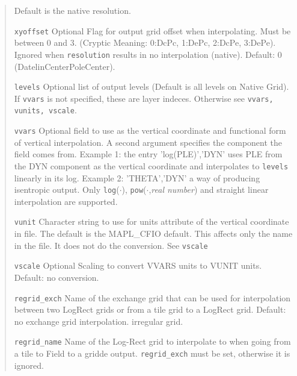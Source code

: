 \begin{quote}
\begin{trivlist}
                          Default is the native resolution.
 \item[\tt xyoffset]      Optional Flag for output grid offset when interpolating. Must be
                          between 0 and 3. (Cryptic Meaning: 0:DcPc, 1:DePc, 2:DcPe, 3:DePe).
                          Ignored when {\tt resolution} results in no interpolation (native).
                          Default: 0 (DatelinCenterPoleCenter). 
 \item[\tt levels]        Optional list of output levels (Default is all levels on Native Grid).
                          If {\tt vvars} is not specified, these are layer indeces. Otherwise
                          see {\tt vvars, vunits, vscale}.
 \item[\tt vvars]         Optional field to use as the vertical coordinate and functional form
                          of vertical interpolation. A second argument specifies 
                          the component the field comes from. 
                          Example 1: the entry 'log(PLE)','DYN' uses PLE from the
                          DYN component as the vertical coordinate and interpolates
                          to {\tt levels} linearly in its log. Example 2: 'THETA','DYN'
                          a way of producing isentropic output.
                          Only {\tt log}($\cdot$), {\tt pow}($\cdot$,{\em real number})
                          and straight linear interpolation are supported.
 \item[\tt vunit]         Character string to use for units attribute of the vertical 
                          coordinate in file. 
                          The default is the MAPL\_CFIO default. 
                          This affects only the name in the file.
                          It does not do the conversion. See {\tt vscale}
 \item[\tt vscale]        Optional Scaling to convert VVARS units to VUNIT units.
                          Default: no conversion.
 \item[\tt regrid\_exch]  Name of the exchange grid that can be used for interpolation
                          between two LogRect grids or from a tile grid to a LogRect grid.
                          Default: no exchange grid interpolation.
                          irregular grid.
 \item[\tt regrid\_name]  Name of the Log-Rect grid to interpolate to when going from a tile 
                          to Field to a gridde output. {\tt regrid\_exch} must be set, otherwise
                          it is ignored.
\end{trivlist}
\end{quote}

